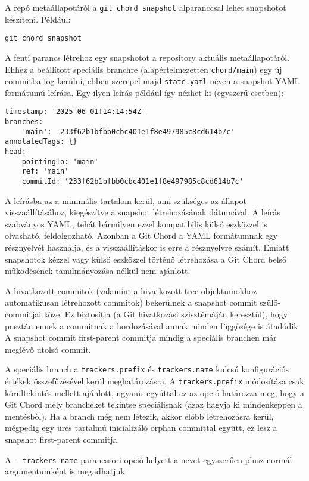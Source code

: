 \documentclass[final]{elteikthesis}[2025/03/25]
\begin{document}
A repó metaállapotáról a \verb|git chord snapshot| alparanccsal lehet snapshotot készíteni.
Például:

\begin{verbatim}
git chord snapshot
\end{verbatim}

A fenti parancs létrehoz egy snapshotot a repository aktuális metaállapotáról.
Ehhez a beállított speciális branchre (alapértelmezetten \verb|chord/main|) egy új commitba fog kerülni,
ebben szerepel majd \verb|state.yaml| néven a snapshot YAML formátumú leírása.
Egy ilyen leírás például így nézhet ki (egyszerű esetben):

\begin{verbatim}
timestamp: '2025-06-01T14:14:54Z'
branches:
    'main': '233f62b1bfbb0cbc401e1f8e497985c8cd614b7c'
annotatedTags: {}
head:
    pointingTo: 'main'
    ref: 'main'
    commitId: '233f62b1bfbb0cbc401e1f8e497985c8cd614b7c'
\end{verbatim}

A leírásba az a minimális tartalom kerül, ami szükséges az állapot visszaállításához,
kiegészítve a snapshot létrehozásának dátumával.
A leírás szabványos YAML, tehát bármilyen ezzel kompatibilis
külső eszközzel is olvasható, feldolgozható.
Azonban a Git Chord a YAML formátumnak egy résznyelvét használja,
és a visszaállításkor is erre a résznyelvre számít.
Emiatt snapshotok kézzel vagy külső eszközzel történő létrehozása
a Git Chord belső működésének tanulmányozása nélkül nem ajánlott.

A hivatkozott commitok (valamint a hivatkozott tree objektumokhoz automatikusan létrehozott commitok)
bekerülnek a snapshot commit szülő-commitjai közé.
Ez biztosítja (a Git hivatkozási szisztémáján keresztül),
hogy pusztán ennek a commitnak a hordozásával annak minden függősége is átadódik.
A snapshot commit first-parent commitja mindig a speciális branchen már meglévő utolsó commit.

A speciális branch a \verb|trackers.prefix| és \verb|trackers.name| kulcsú konfigurációs értékek összefűzésével kerül meghatározásra.
A \verb|trackers.prefix| módosítása csak körültekintés mellett ajánlott,
ugyanis egyúttal ez az opció határozza meg,
hogy a Git Chord mely brancheket tekintse speciálisnak
(azaz hagyja ki mindenképpen a mentésből).
Ha a branch még nem létezik, akkor előbb létrehozásra kerül,
mégpedig egy üres tartalmú inicializáló orphan committal együtt,
ez lesz a snapshot first-parent commitja.

A \verb|--trackers-name| parancssori opció helyett a nevet egyszerűen plusz normál argumentumként is megadhatjuk:
\end{document}
